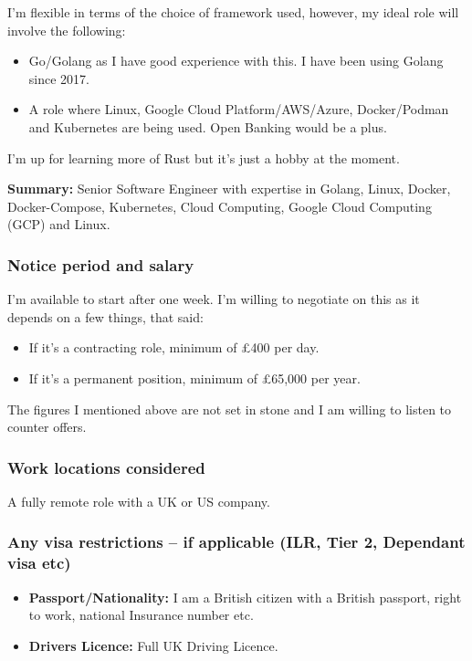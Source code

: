 \documentclass[
  a4paper,
]{article}
\providecommand{\tightlist}{%
  \setlength{\itemsep}{0pt}\setlength{\parskip}{0pt}}
\begin{document}
I'm flexible in terms of the choice of framework used, however, my ideal
role will involve the following:

\begin{itemize}
\tightlist
\item
  Go/Golang as I have good experience with this. I have been using
  Golang since 2017.
\item
  A role where Linux, Google Cloud Platform/AWS/Azure, Docker/Podman and
  Kubernetes are being used. Open Banking would be a plus.
\end{itemize}

I'm up for learning more of Rust but it's just a hobby at the moment.

\textbf{Summary:} Senior Software Engineer with expertise in Golang,
Linux, Docker, Docker-Compose, Kubernetes, Cloud Computing, Google Cloud
Computing (GCP) and Linux.

\hypertarget{notice-period-and-salary}{%
\subsubsection{Notice period and
salary}\label{notice-period-and-salary}}

I'm available to start after one week. I'm willing to negotiate on this
as it depends on a few things, that said:

\begin{itemize}
\tightlist
\item
  If it's a contracting role, minimum of £400 per day.
\item
  If it's a permanent position, minimum of £65,000 per year.
\end{itemize}

The figures I mentioned above are not set in stone and I am willing to
listen to counter offers.

\hypertarget{work-locations-considered}{%
\subsubsection{Work locations
considered}\label{work-locations-considered}}

A fully remote role with a UK or US company.

\hypertarget{any-visa-restrictions-if-applicable-ilr-tier-2-dependant-visa-etc}{%
\subsubsection{Any visa restrictions -- if applicable (ILR, Tier 2,
Dependant visa
etc)}\label{any-visa-restrictions-if-applicable-ilr-tier-2-dependant-visa-etc}}

\begin{itemize}
\tightlist
\item
  \textbf{Passport/Nationality:} I am a British citizen with a British
  passport, right to work, national Insurance number etc.
\item
  \textbf{Drivers Licence:} Full UK Driving Licence.
\end{itemize}
\end{document}
